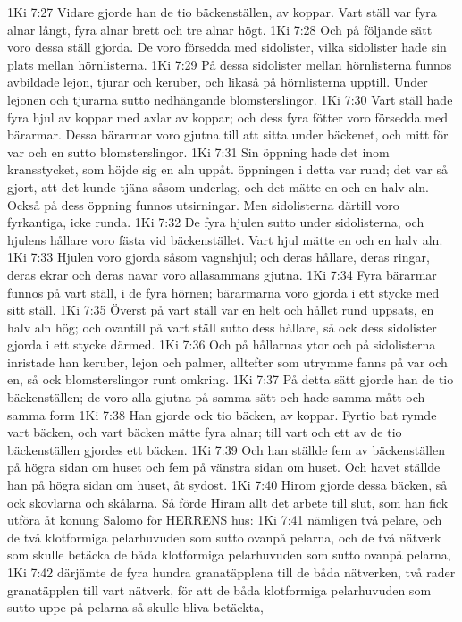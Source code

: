 1Ki 7:27  Vidare gjorde han de tio bäckenställen, av koppar. Vart ställ var fyra alnar långt, fyra alnar brett och tre alnar högt.
1Ki 7:28  Och på följande sätt voro dessa ställ gjorda. De voro försedda med sidolister, vilka sidolister hade sin plats mellan hörnlisterna.
1Ki 7:29  På dessa sidolister mellan hörnlisterna funnos avbildade lejon, tjurar och keruber, och likaså på hörnlisterna upptill. Under lejonen och tjurarna sutto nedhängande blomsterslingor.
1Ki 7:30  Vart ställ hade fyra hjul av koppar med axlar av koppar; och dess fyra fötter voro försedda med bärarmar. Dessa bärarmar voro gjutna till att sitta under bäckenet, och mitt för var och en sutto blomsterslingor.
1Ki 7:31  Sin öppning hade det inom kransstycket, som höjde sig en aln uppåt. öppningen i detta var rund; det var så gjort, att det kunde tjäna såsom underlag, och det mätte en och en halv aln. Också på dess öppning funnos utsirningar. Men sidolisterna därtill voro fyrkantiga, icke runda.
1Ki 7:32  De fyra hjulen sutto under sidolisterna, och hjulens hållare voro fästa vid bäckenstället. Vart hjul mätte en och en halv aln.
1Ki 7:33  Hjulen voro gjorda såsom vagnshjul; och deras hållare, deras ringar, deras ekrar och deras navar voro allasammans gjutna.
1Ki 7:34  Fyra bärarmar funnos på vart ställ, i de fyra hörnen; bärarmarna voro gjorda i ett stycke med sitt ställ.
1Ki 7:35  Överst på vart ställ var en helt och hållet rund uppsats, en halv aln hög; och ovantill på vart ställ sutto dess hållare, så ock dess sidolister gjorda i ett stycke därmed.
1Ki 7:36  Och på hållarnas ytor och på sidolisterna inristade han keruber, lejon och palmer, alltefter som utrymme fanns på var och en, så ock blomsterslingor runt omkring.
1Ki 7:37  På detta sätt gjorde han de tio bäckenställen; de voro alla gjutna på samma sätt och hade samma mått och samma form
1Ki 7:38  Han gjorde ock tio bäcken, av koppar. Fyrtio bat rymde vart bäcken, och vart bäcken mätte fyra alnar; till vart och ett av de tio bäckenställen gjordes ett bäcken.
1Ki 7:39  Och han ställde fem av bäckenställen på högra sidan om huset och fem på vänstra sidan om huset. Och havet ställde han på högra sidan om huset, åt sydost.
1Ki 7:40  Hirom gjorde dessa bäcken, så ock skovlarna och skålarna. Så förde Hiram allt det arbete till slut, som han fick utföra åt konung Salomo för HERRENS hus:
1Ki 7:41  nämligen två pelare, och de två klotformiga pelarhuvuden som sutto ovanpå pelarna, och de två nätverk som skulle betäcka de båda klotformiga pelarhuvuden som sutto ovanpå pelarna,
1Ki 7:42  därjämte de fyra hundra granatäpplena till de båda nätverken, två rader granatäpplen till vart nätverk, för att de båda klotformiga pelarhuvuden som sutto uppe på pelarna så skulle bliva betäckta,
